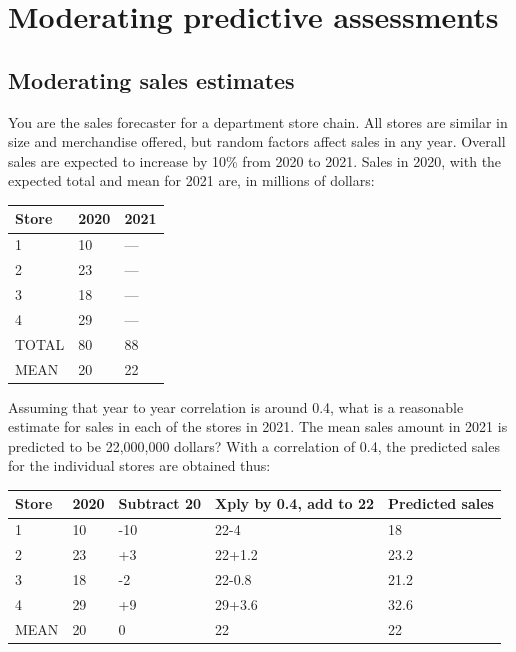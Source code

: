 \documentclass[
  10pt,
  b5paper]{book}
\begin{document}
\hypertarget{moderating-predictive-assessments}{%
\section{Moderating predictive assessments}\label{moderating-predictive-assessments}}

\hypertarget{moderating-sales-estimates}{%
\subsection*{Moderating sales estimates}\label{moderating-sales-estimates}}

You are the sales forecaster for a department store chain.
All stores are similar in size and merchandise offered,
but random factors affect sales in any year. Overall sales
are expected to increase by 10\% from 2020 to 2021. Sales
in 2020, with the expected total and mean for 2021 are,
in millions of dollars:

\begin{longtable}[]{@{}lll@{}}
\toprule
Store & 2020 & 2021 \\
\midrule
\endhead
1 & 10 & --- \\
2 & 23 & --- \\
3 & 18 & --- \\
4 & 29 & --- \\
TOTAL & 80 & 88 \\
MEAN & 20 & 22 \\
\bottomrule
\end{longtable}

Assuming that year to year correlation is around 0.4,
what is a reasonable estimate for sales in each of the
stores in 2021. The mean sales amount in 2021 is predicted
to be 22,000,000 dollars? With a correlation of 0.4, the
predicted sales for the individual stores are obtained thus:

\begin{longtable}[]{@{}lllll@{}}
\toprule
Store & 2020 & Subtract 20 & Xply by 0.4, add to 22 & Predicted sales \\
\midrule
\endhead
1 & 10 & -10 & 22-4 & 18 \\
2 & 23 & +3 & 22+1.2 & 23.2 \\
3 & 18 & -2 & 22-0.8 & 21.2 \\
4 & 29 & +9 & 29+3.6 & 32.6 \\
MEAN & 20 & 0 & 22 & 22 \\
\bottomrule
\end{longtable}
\end{document}
